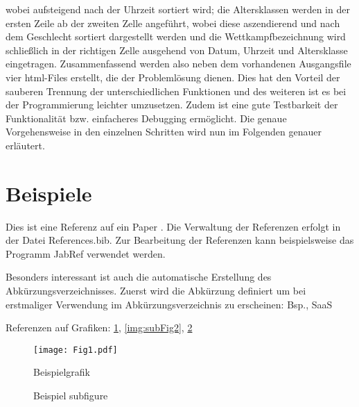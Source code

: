 wobei aufsteigend nach der Uhrzeit sortiert wird; die Altersklassen werden in der ersten Zeile ab der zweiten Zelle angeführt, wobei diese aszendierend und nach dem Geschlecht sortiert dargestellt werden und die Wettkampfbezeichnung wird schließlich in der richtigen Zelle ausgehend von Datum, Uhrzeit und Altersklasse eingetragen. 
Zusammenfassend werden also neben dem vorhandenen Ausgangsfile vier html-Files erstellt, die der Problemlösung dienen. Dies hat den Vorteil der sauberen Trennung der unterschiedlichen Funktionen und des weiteren ist es bei der Programmierung leichter umzusetzen. Zudem ist eine gute Testbarkeit der Funktionalität bzw. einfacheres Debugging ermöglicht. Die genaue Vorgehensweise in den einzelnen Schritten wird nun im Folgenden genauer erläutert.

\section{Beispiele}
Dies  ist eine Referenz auf ein Paper \cite{Kolter2009}. Die Verwaltung der Referenzen erfolgt in der Datei References.bib. Zur Bearbeitung der Referenzen kann beispielsweise das Programm JabRef verwendet werden.

Besonders interessant ist auch die automatische Erstellung des Abkürzungsverzeichnisses. Zuerst wird die Abkürzung definiert um bei erstmaliger Verwendung im Abkürzungsverzeichnis zu erscheinen: \ac{Bsp.}, \ac{SaaS}

Referenzen auf Grafiken: \ref{fig:Fig1}, \ref{img:subFig2}, \ref{img:subFigs}

\begin{figure}
  \centering
  \texttt{[image: Fig1.pdf]}
  \caption{Beispielgrafik}
  \label{fig:Fig1}
\end{figure}


\begin{figure}
  \centering
  \hfill
  \hfill
  \caption{Beispiel subfigure}
  \label{img:subFigs}
\end{figure}



\lstset{language=JAVA, breaklines=true, tabsize=2}



